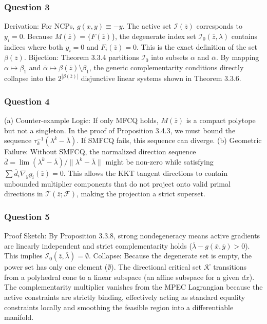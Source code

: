 \documentclass[pdflatex,sn-mathphys-num]{sn-jnl}%
\theoremstyle{definition}
\begin{document}
\subsubsection*{Question 3}
Derivation: For NCPs, $g(x,y) \equiv -y$. The active set $\mathcal{I}(\overline{z})$ corresponds to $y_i = 0$. Because $M(\overline{z}) = \{F(\overline{z})\}$, the degenerate index set $\mathcal{I}_0(\overline{z}, \lambda)$ contains indices where both $y_i = 0$ and $F_i(\overline{z}) = 0$. This is the exact definition of the set $\beta(\overline{z})$.
Bijection: Theorem 3.3.4 partitions $\mathcal{I}_0$ into subsets $\alpha$ and $\overline{\alpha}$. By mapping $\alpha \mapsto \beta_1$ and $\overline{\alpha} \mapsto \beta(\overline{z}) \setminus \beta_1$, the generic complementarity conditions directly collapse into the $2^{|\beta(\overline{z})|}$ disjunctive linear systems shown in Theorem 3.3.6. 

\subsubsection*{Question 4}
(a) Counter-example Logic: If only MFCQ holds, $M(\overline{z})$ is a compact polytope but not a singleton. In the proof of Proposition 3.4.3, we must bound the sequence $\tau_k^{-1}(\lambda^k - \overline{\lambda})$. If SMFCQ fails, this sequence can diverge.
(b) Geometric Failure: Without SMFCQ, the normalized direction sequence $\overline{d} = \lim (\lambda^k - \overline{\lambda}) / \|\lambda^k - \overline{\lambda}\|$ might be non-zero while satisfying $\sum \overline{d}_i \nabla_y g_i(\overline{z}) = 0$. This allows the KKT tangent directions to contain unbounded multiplier components that do not project onto valid primal directions in $\mathcal{T}(\overline{z}; \mathcal{F})$, making the projection a strict superset.

\subsubsection*{Question 5}
Proof Sketch: By Proposition 3.3.8, strong nondegeneracy means active gradients are linearly independent and strict complementarity holds ($\overline{\lambda} - g(\overline{x},\overline{y}) > 0$). This implies $\mathcal{I}_0(\overline{z}, \overline{\lambda}) = \emptyset$. 
Collapse: Because the degenerate set is empty, the power set has only one element ($\emptyset$). The directional critical set $\mathcal{K}$ transitions from a polyhedral cone to a linear subspace (an affine subspace for a given $dx$). The complementarity multiplier vanishes from the MPEC Lagrangian because the active constraints are strictly binding, effectively acting as standard equality constraints locally and smoothing the feasible region into a differentiable manifold.
\end{document}
